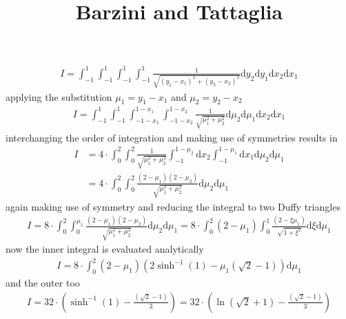 \documentclass{article}
\title{Barzini and Tattaglia}
\newcommand{\td}{\mathrm{d}}
\begin{document}
\maketitle

\begin{align}
I = 
\int_{-1}^1
\int_{-1}^1
\int_{-1}^1
\int_{-1}^1
\frac{1}{\sqrt{(y_1-x_1)^2+(y_2-x_2)^2}}
\td y_2
\td y_1
\td x_2
\td x_1
\end{align}
%
applying the substitution $\mu_1 = y_1 - x_1$ and $\mu_2 = y_2-x_2$
%
\begin{align}
I = \int_{-1}^1
\int_{-1}^1
\int_{-1-x_1}^{1-x_1}
\int_{-1-x_2}^{1-x_2}
\frac{1}{\sqrt{\mu_1^2+\mu_2^2}}
\td \mu_2
\td \mu_1
\td x_2
\td x_1
\end{align}
%
interchanging the order of integration and making use of symmetries results in
%
\begin{align}
I &= 4\cdot
\int_{0}^{2}
\int_{0}^{2}
\frac{1}{\sqrt{\mu_1^2+\mu_2^2}}
\int_{-1}^{1-\mu_2}
\td x_2
\int_{-1}^{1-\mu_1}
\td x_1
\td \mu_2
\td \mu_1 \nonumber \\
&= 4\cdot
\int_{0}^{2}
\int_{0}^{2}
\frac{(2-\mu_1) (2-\mu_2)}{\sqrt{\mu_1^2+\mu_2^2}}
\td \mu_2
\td \mu_1
\end{align}
%
again making use of symmetry and reducing the integral to two Duffy triangles
%
\begin{align}
I = 8\cdot
\int_{0}^{2}
\int_{0}^{\mu_1}
\frac{(2-\mu_1) (2-\mu_2)}{\sqrt{\mu_1^2+\mu_2^2}}
\td \mu_2
\td \mu_1 
= 8\cdot
\int_{0}^{2}
(2-\mu_1) 
\int_{0}^{1}
\frac{(2-\xi\mu_1)}{\sqrt{1+\xi^2}}
\td \xi
\td \mu_1
\end{align}
%
now the inner integral is evaluated analytically
%
\begin{align}
I = 8\cdot
\int_{0}^{2}
(2-\mu_1) 
\left(2 \sinh^{-1}(1) - \mu_1\left(\sqrt{2}-1\right)\right)
\td \mu_1
\end{align}
%
and the outer too
%
\begin{align}
I = 32 \cdot
\left( \sinh^{-1}(1) - \frac{\left(\sqrt{2}-1\right)}{3} \right)
=
32 \cdot
\left( \ln\left(\sqrt{2}+1\right) - \frac{\left(\sqrt{2}-1\right)}{3} \right)
\end{align}
\end{document}
